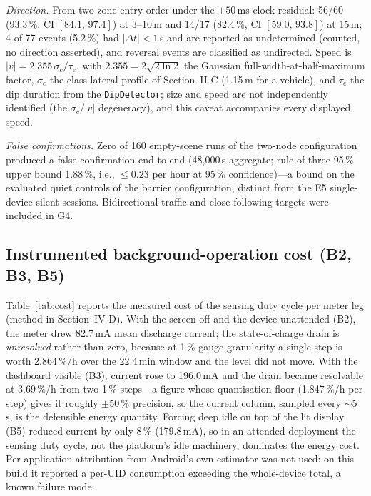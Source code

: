 \documentclass[journal,10pt]{IEEEtran}
\begin{document}
\emph{Direction.} From two-zone entry order under the $\pm50$\,ms clock
residual: 56/60 (93.3\,\%, CI $[84.1,\,97.4]$) at 3--10\,m and 14/17 (82.4\,\%,
CI $[59.0,\,93.8]$) at 15\,m; 4 of 77 events (5.2\,\%) had $|\Delta t| < 1$\,s
and are reported as undetermined (counted, no direction asserted), and reversal
events are classified as undirected. Speed is $|v| = 2.355\,\sigma_c/\tau_e$,
with $2.355 = 2\sqrt{2\ln 2}$ the Gaussian full-width-at-half-maximum factor,
$\sigma_c$ the class lateral profile of Section~II-C (1.15\,m for a vehicle),
and $\tau_e$ the dip duration from the \texttt{DipDetector}; size and speed are
not independently identified (the $\sigma_c/|v|$ degeneracy), and this caveat
accompanies every displayed speed.

\emph{False confirmations.} Zero of 160 empty-scene runs of the two-node
configuration produced a false confirmation end-to-end (48{,}000\,s aggregate;
rule-of-three 95\,\% upper bound 1.88\,\%, i.e., $\le 0.23$ per hour at
95\,\% confidence)---a bound on the evaluated quiet controls of the barrier
configuration, distinct from the E5 single-device silent sessions. Bidirectional
traffic and close-following targets were included in G4.

\subsection{Instrumented background-operation cost (B2, B3, B5)}
\label{sec:bgcost}
Table~\ref{tab:cost} reports the measured cost of the sensing duty cycle per
meter leg (method in Section~IV-D). With the screen off and the device
unattended (B2), the meter drew 82.7\,mA mean discharge current; the
state-of-charge drain is \emph{unresolved} rather than zero, because at 1\,\%
gauge granularity a single step is worth 2.864\,\%/h over the 22.4\,min window
and the level did not move. With the dashboard visible (B3), current rose to
196.0\,mA and the drain became resolvable at 3.69\,\%/h from two 1\,\%
steps---a figure whose quantisation floor (1.847\,\%/h per step) gives it
roughly $\pm50$\,\% precision, so the current column, sampled every $\sim$5\,s,
is the defensible energy quantity. Forcing deep idle on top of the lit display
(B5) reduced current by only 8\,\% (179.8\,mA), so in an attended deployment
the sensing duty cycle, not the platform's idle machinery, dominates the energy
cost. Per-application attribution from Android's own estimator was not used: on
this build it reported a per-UID consumption exceeding the whole-device total, a
known failure mode.
\end{document}
